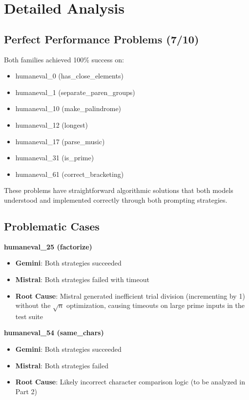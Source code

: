 \documentclass[11pt]{article}
\begin{document}
\section{Detailed Analysis}

\subsection{Perfect Performance Problems (7/10)}

Both families achieved 100\% success on:
\begin{itemize}
    \item humaneval\_0 (has\_close\_elements)
    \item humaneval\_1 (separate\_paren\_groups)
    \item humaneval\_10 (make\_palindrome)
    \item humaneval\_12 (longest)
    \item humaneval\_17 (parse\_music)
    \item humaneval\_31 (is\_prime)
    \item humaneval\_61 (correct\_bracketing)
\end{itemize}

These problems have straightforward algorithmic solutions that both models understood and implemented correctly through both prompting strategies.

\subsection{Problematic Cases}

\textbf{humaneval\_25 (factorize)}

\begin{itemize}
    \item \textbf{Gemini}: Both strategies succeeded
    \item \textbf{Mistral}: Both strategies failed with timeout
    \item \textbf{Root Cause}: Mistral generated inefficient trial division (incrementing by 1) without the $\sqrt{n}$ optimization, causing timeouts on large prime inputs in the test suite
\end{itemize}

\textbf{humaneval\_54 (same\_chars)}

\begin{itemize}
    \item \textbf{Gemini}: Both strategies succeeded
    \item \textbf{Mistral}: Both strategies failed
    \item \textbf{Root Cause}: Likely incorrect character comparison logic (to be analyzed in Part 2)
\end{itemize}
\end{document}
